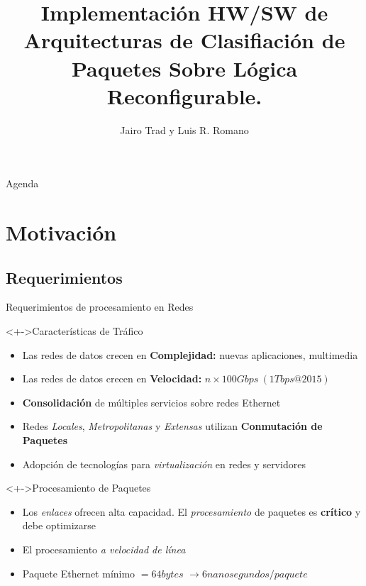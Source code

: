 \documentclass[xcolor=dvipsnames]{beamer}
\title[] {Implementación HW/SW de Arquitecturas de Clasifiación de Paquetes Sobre Lógica Reconfigurable.}
\author[] {Jairo Trad y Luis R. Romano}
\institute[Universidades] %
{
  \scriptsize Laboratorio de Comunicaciones Digitales \\
  \scriptsize Universidad Nacional de Córdoba, Facultad Ciencias Exactas, Físicas y Naturales \\ 
}
\begin{document}
\begin{frame}
  \titlepage
\end{frame}

\begin{frame}{Agenda}
  \tableofcontents
\end{frame}

\scriptsize

\section{Motivación}

\subsection{Requerimientos}

\begin{frame}{Requerimientos de procesamiento en Redes}
  \scriptsize
  
  \begin{block}<+->{Características de Tráfico}

    \begin{itemize}
      \item Las redes de datos crecen en {\bf Complejidad:} nuevas aplicaciones, multimedia

      \item Las redes de datos crecen en {\bf Velocidad:} $n \times 100 Gbps\ (1Tbps@2015)$

      \item {\bf Consolidación} de múltiples servicios sobre redes Ethernet
      
      \item Redes \emph{Locales}, \emph{Metropolitanas} y \emph{Extensas} utilizan {\bf Conmutación de Paquetes}

      \item Adopción de tecnologías para \emph{virtualización} en redes y servidores
    \end{itemize}
    
  \end{block}
    
  \begin{block}<+->{Procesamiento de Paquetes}
    \begin{itemize}

      \item Los \emph{enlaces} ofrecen alta capacidad. El \emph{procesamiento} de paquetes es {\bf crítico} y debe optimizarse

      \item El procesamiento \emph{a velocidad de línea}

      \item Paquete Ethernet mínimo $=64 bytes$ $\rightarrow 6 nanosegundos/paquete$  
    \end{itemize}    
  \end{block}

\end{frame}
\end{document}
